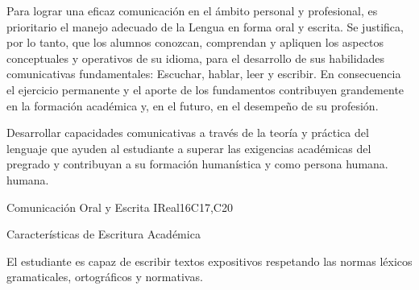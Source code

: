 \begin{syllabus}


\begin{justification}
Para lograr una eficaz comunicación en el ámbito personal y profesional, es prioritario el manejo adecuado de la Lengua en forma oral y escrita. Se justifica, por lo tanto, que los alumnos conozcan, comprendan y apliquen los aspectos conceptuales y operativos de su idioma, para el desarrollo de sus habilidades comunicativas fundamentales: Escuchar, hablar, leer y escribir.
En consecuencia el ejercicio permanente y el aporte de los fundamentos contribuyen grandemente en la formación académica y, en el futuro, en el desempeño de su profesión.
\end{justification}

\begin{goals}
\item Desarrollar capacidades comunicativas a través de la teoría y práctica del lenguaje que ayuden al estudiante a superar las exigencias académicas del pregrado y contribuyan a su formación humanística y como persona humana. humana.
\end{goals}

\begin{outcomes}
   \item {}
   \item {}
   \item {}
\end{outcomes}

\begin{competences}
    \item {}
    \item {}
    \item {}
\end{competences}

\begin{unit}{}{Comunicación Oral y Escrita I}{Real}{16}{C17,C20}
\begin{topics}
      \item Características de Escritura Académica
\end{topics}

\begin{learningoutcomes}
   \item El estudiante es capaz de escribir textos expositivos respetando las normas léxicos gramaticales, ortográficos y normativas.
\end{learningoutcomes}
\end{unit}


\begin{coursebibliography}
\end{coursebibliography}

\end{syllabus}
